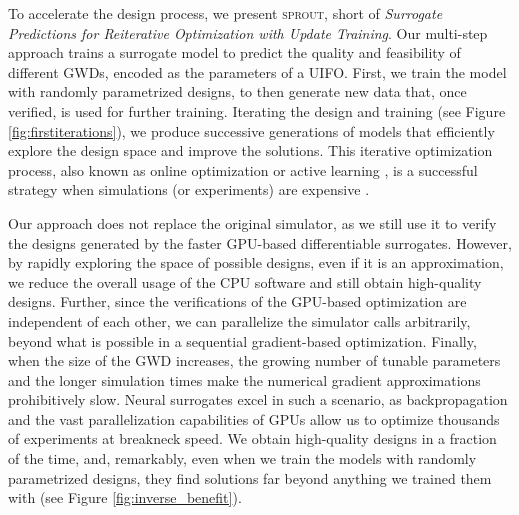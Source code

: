 \documentclass[a4paper,twocolumn,11pt,unpublished]{quantumarticle}
\newcommand{\algorithm}{\textsc{sprout}}
\begin{document}
To accelerate the design process, we present \algorithm, short of \textit{Surrogate Predictions for Reiterative Optimization with Update Training}. Our multi-step approach trains a surrogate model to predict the quality and feasibility of different GWDs, encoded as the parameters of a UIFO. First, we train the model with randomly parametrized designs, to then generate new data that, once verified, is used for further training. Iterating the design and training (see Figure \ref{fig:firstiterations}), we produce successive generations of models that efficiently explore the design space and improve the solutions. This iterative optimization process, also known as online optimization or active learning \cite{active2009, li2024survey}, is a successful strategy when simulations (or experiments) are expensive \cite{kandasamy2016gaussian, tran2018active, lookman2019active, van2024traversing}. %

Our approach does not replace the original simulator, as we still use it to verify the designs generated by the faster GPU-based differentiable surrogates. However, by rapidly exploring the space of possible designs, even if it is an approximation, we reduce the overall usage of the CPU software and still obtain high-quality designs. Further, since the verifications of the GPU-based optimization are independent of each other, we can parallelize the simulator calls arbitrarily, beyond what is possible in a sequential gradient-based optimization. Finally, when the size of the GWD increases, the growing number of tunable parameters and the longer simulation times make the numerical gradient approximations prohibitively slow. Neural surrogates excel in such a scenario, as backpropagation and the vast parallelization capabilities of GPUs allow us to optimize thousands of experiments at breakneck speed. We obtain high-quality designs in a fraction of the time, and, remarkably, even when we train the models with randomly parametrized designs, they find solutions far beyond anything we trained them with (see Figure \ref{fig:inverse_benefit}).
\end{document}
